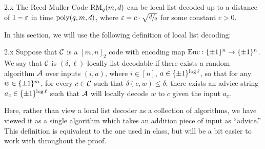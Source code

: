 \documentclass[11pt]{article}
\begin{document}
\begin{theorem}{2.x}
    The Reed-Muller Code $\mathrm{RM}_q(m, d)$ can be local list decoded up to a distance of $1 - \varepsilon$ in time $\mathrm{poly}(q, m, d)$, where $\varepsilon = c \cdot \sqrt{\sfrac{d}{q}}$ for some constant $c > 0$.
\end{theorem}

In this section, we will use the following definition of local list decoding:

\begin{definition}{2.x}
    Suppose that $\mathcal{C}$ is a $[m, n]_2$ code with encoding map $\mathrm{Enc} : \{\pm 1\}^{n} \rightarrow \{\pm 1\}^n$. We say that $\mathcal{C}$ is $(\delta, \ell)$-locally list decodable if there exists a random algorithm $\mathcal{A}$ over inputs $(i, a)$, where $i \in [n]$, $a \in \{\pm 1\}^{\log \ell}$, so that for any $w \in \{\pm 1\}^m$, for every $c \in \mathcal{C}$ such that $\delta(c, w) \leq \delta$, there exists an advice string $a_c \in \{\pm 1\}^{\log \ell}$ such that $\mathcal{A}$ will locally decode $w$ to $c$ given the input $a_c$.
\end{definition}

Here, rather than view a local list decoder as a collection of algorithms, we have viewed it as a single algorithm which takes an addition piece of input as ``advice.'' This definition is equivalent to the one used in class, but will be a bit easier to work with throughout the proof.
\end{document}
